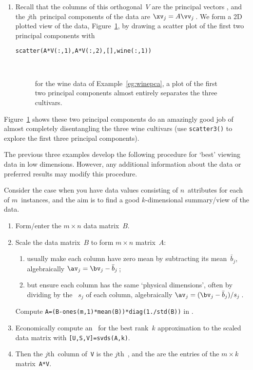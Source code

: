 \begin{example}
\begin{solution}
\begin{enumerate}
\item Recall that the columns of this orthogonal~\(V\) are the principal vectors \hlist{}, and the \(j\)th~principal components of the data are \(\xv_j=A\vv_j\)\,.
We form a 2D plotted view of the data, Figure~\ref{fig:winepca}, by drawing a scatter plot of the first two principal components with 
\begin{verbatim}
scatter(A*V(:,1),A*V(:,2),[],wine(:,1))
\end{verbatim}
\begin{figure}
\centering
\\
\caption{for the wine data of Example~\ref{eg:winepca}, a plot of the first two principal components almost entirely separates the three cultivars.}
\label{fig:winepca}
\end{figure}
\end{enumerate}
Figure~\ref{fig:winepca} shows these two principal components do an amazingly good job of almost completely disentangling the three wine cultivars (use \verb|scatter3()| to explore the first three principal components).
\end{solution}
\end{example}


The previous three examples develop the following procedure for `best' viewing data in low dimensions.
However, any additional information about the data or preferred results may modify this procedure. 


\begin{procedure} \label{pro:pca}
Consider the case when you have data values consisting of \(n\)~attributes for each of \(m\)~instances, and the aim is to find a good \(k\)-dimensional summary\slash view of the data. 
\begin{enumerate}
\item Form\slash enter the \(m\times n\) data matrix~\(B\).
\item {}Scale the data matrix~\(B\) to form \(m\times n\) matrix~\(A\):
\begin{enumerate}
\item usually make each column have zero mean by subtracting its mean~\(\bar b_j\), algebraically \(\av_j=\bv_j-\bar b_j\)\,;
\item but ensure each column has the same `physical dimensions', often by dividing by the ~\(s_j\) of each column, algebraically \(\av_j=(\bv_j-\bar b_j)/s_j\)\,.
\end{enumerate}
Compute \verb|A=(B-ones(m,1)*mean(B))*diag(1./std(B))| in \script.
\item  Economically compute an \svd\ for the best rank~\(k\) approximation to the scaled data matrix with \verb|[U,S,V]=svds(A,k)|.
\item Then the \(j\)th~column of~\verb|V| is the \(j\)th~, and the  are the entries of the \(m\times k\) matrix~\verb|A*V|.
\end{enumerate}
\end{procedure}




